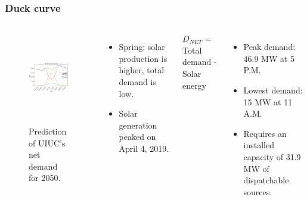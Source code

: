 \begin{frame}
\frametitle{Duck curve}
\begin{columns}
    \column[t]{5cm}
	\begin{figure}[htbp!]
		\begin{center}
			\includegraphics[height=4.0cm]{images/uiuc-duck}
		\end{center}
		\caption{Prediction of UIUC's net demand for 2050.}
	\end{figure}

    \column[t]{5.5cm}
    \begin{itemize}
 		\item Spring: solar production is higher, total demand is low.
 		\item Solar generation peaked on April 4, 2019. \vspace{0.5cm}
 	\end{itemize}

 	$D_{NET}$ = Total demand - Solar energy
	\begin{itemize}
 		\item Peak demand: 46.9 MW at 5 P.M.
 		\item Lowest demand: 15 MW at 11 A.M.
 		\item Requires an installed capacity of 31.9 MW of dispatchable sources.
 	\end{itemize}
\end{columns}
\end{frame}

